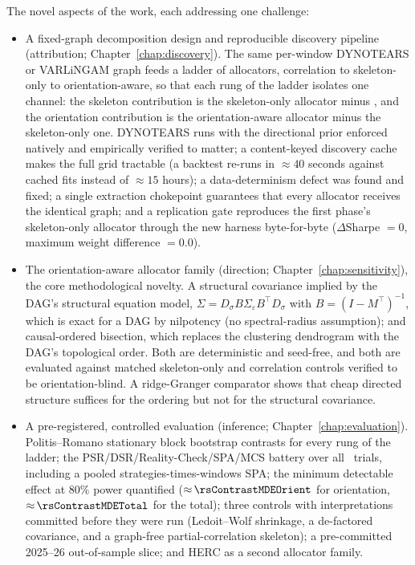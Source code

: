 \noindent The novel aspects of the work, each addressing one challenge:

\begin{itemize}[itemsep=2pt, topsep=3pt]
  \item A fixed-graph decomposition design and reproducible
    discovery pipeline (attribution; Chapter~\ref{chap:discovery}). The
    same per-window DYNOTEARS or VARLiNGAM graph feeds a ladder of
    allocators, correlation \HRP{} to skeleton-only to orientation-aware,
    so that each rung of the ladder isolates one channel: the skeleton
    contribution is the skeleton-only allocator minus \HRP{}, and the
    orientation contribution is the orientation-aware allocator minus the
    skeleton-only one. DYNOTEARS runs with the directional prior enforced
    natively and empirically verified to matter; a content-keyed discovery
    cache makes the full grid tractable (a backtest re-runs in
    ${\approx}40$ seconds against cached fits instead of ${\approx}15$
    hours); a data-determinism defect was found and fixed; a single
    extraction chokepoint guarantees that every allocator receives the
    identical graph; and a replication gate reproduces the first phase's skeleton-only
    allocator through the new harness byte-for-byte ($\Delta$Sharpe $=0$,
    maximum weight difference $=0.0$).
  \item The orientation-aware allocator family (direction;
    Chapter~\ref{chap:sensitivity}), the core methodological novelty. A
    structural covariance implied by the DAG's structural equation model,
    $\Sigma = D_\sigma B \Sigma_\varepsilon B^{\top} D_\sigma$ with
    $B=(I-M^{\top})^{-1}$, which is exact for a DAG by nilpotency (no
    spectral-radius assumption); and causal-ordered bisection, which
    replaces the clustering dendrogram with the DAG's topological order.
    Both are deterministic and seed-free, and both are evaluated against
    matched skeleton-only and correlation controls verified to be
    orientation-blind. A ridge-Granger comparator shows that cheap
    directed structure suffices for the ordering but not for the
    structural covariance.
  \item A pre-registered, controlled evaluation (inference;
    Chapter~\ref{chap:evaluation}). Politis--Romano stationary block
    bootstrap contrasts for every rung of the ladder; the
    PSR/DSR/Reality-Check/SPA/MCS battery over all \rsNtrials\ trials,
    including a pooled strategies-times-windows SPA; the minimum
    detectable effect at $80\%$ power quantified
    (${\approx}\,\rsContrastMDEOrient$ for orientation,
    ${\approx}\,\rsContrastMDETotal$ for the total); three controls with
    interpretations committed before they were run (Ledoit--Wolf
    shrinkage, a de-factored covariance, and a graph-free
    partial-correlation skeleton); a pre-committed 2025--26 out-of-sample
    slice; and HERC as a second allocator family.
\end{itemize}


